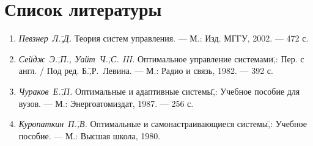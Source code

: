 \documentclass[preprint,russian,a5paper,10pt,twoside,mediummath]{ncc}
\begin{document}
\mbox{}

\clearpage

\setcounter{secnumdepth}{-1}
\section{Список литературы\label{references}}
\setcounter{secnumdepth}{2}
\begin{enumerate}
\item \textit{Певзнер~Л.\=,Д.} Теория систем управления. --- М.: Изд. МГГУ, 2002. --- 472 с.
\item \textit{Сейдж~Э.\=,П., Уайт~Ч.\=,С. III.} Оптимальное управление системами\=,: Пер. с англ. / Под ред. Б.\=,Р.~Левина. --- М.: Радио и связь, 1982. --- 392 с.
\item \textit{Чураков~Е.\=,П.} Оптимальные и адаптивные системы\=,: Учебное пособие для вузов. --- М.: Энергоатомиздат, 1987. --- 256 с.
\item \textit{Куропаткин~П.\=,В.} Оптимальные и самонастраивающиеся системы\=,: Учебное пособие. --- М.: Высшая школа, 1980.
\end{enumerate}

\newpage \thispagestyle{empty} \mbox{} \newpage   
\end{document}
